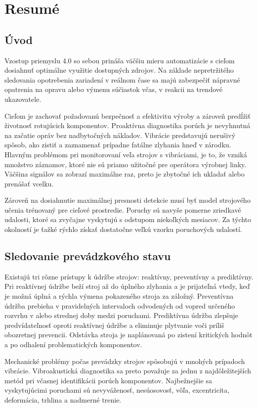 \chapter{Resumé}

\section{Úvod}
Vzostup priemyslu 4.0 so sebou prináša väčšiu mieru automatizácie s cieľom dosiahnuť optimálne využitie dostupných zdrojov. Na základe nepretržitého sledovania opotrebenia zariadení v reálnom čase sa majú zabezpečiť nápravné opatrenia na opravu alebo výmenu súčiastok včas, v reakcii na trendové ukazovatele. 

Cieľom je zachovať požadovanú bezpečnosť a efektivitu výroby a zároveň predĺžiť životnosť rotujúcich komponentov. Proaktívna diagnostika porúch je nevyhnutná na začatie opráv bez nadbytočných nákladov. Vibrácie predstavujú nerušivý spôsob, ako zistiť a zaznamenať prípadne fatálne zlyhania hneď v zárodku. Hlavným problémom pri monitorovaní veľa strojov s vibráciami, je to, že vzniká množstvo záznamov, ktoré nie sú priamo užitočné pre operátora výrobnej linky. Väčšina signálov sa zobrazí maximálne raz, preto je zbytočné ich ukladať alebo prenášať vcelku. 

Zároveň na dosiahnutie maximálnej presnosti detekcie musí byť model strojového učenia trénovaný pre cieľové prostredie. Poruchy sú navyše pomerne zriedkavé udalosti, ktoré sa zvyčajne vyskytujú s odstupom niekoľkých mesiacov. Za týchto okolností je ťažké rýchlo získať dostatočne veľkú vzorku poruchových udalostí.

\section{Sledovanie prevádzkového stavu}
Existujú tri rôzne prístupy k údržbe strojov: reaktívny, preventívny a prediktívny.
Pri reaktívnej údržbe beží stroj až do úplného zlyhania a je prijateľná vtedy, keď je možná úplná a rýchla výmena pokazeného stroja za záložný. Preventívna údržba prebieha v pravidelných intervaloch odvodených od vopred určeného rozvrhu v alebo strednej doby medzi poruchami. Prediktívna údržba zlepšuje predvídateľnosť oproti reaktívnej údržbe a eliminuje plytvanie voči príliš obozretnej prevencii. Odstávka stroja je naplánovaná po zistení kritických hodnôt a po odhalení problematických komponentov.

Mechanické problémy počas prevádzky strojov spôsobujú v mnohých prípadoch vibrácie. Vibroakustická diagnostika sa preto považuje za jednu z najdôležitejších metód pri včasnej identifikácii porúch komponentov. Najbežnejšie sa vyskytujúcimi poruchami sú nevyváženosť, nesúosovosť, vôľa, excentricita, deformácia, trhlina a nadmerné trenie. 

